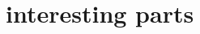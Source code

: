 \documentclass[12pt]{report}
\begin{document}
\section{interesting parts}



\cite{efficient-error}
\cite{multiple-defect}
\cite{incremental}
\cite{exclusive-test}
\cite{modeling-unknown}


 


\appendix

\end{document}
